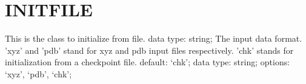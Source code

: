 \section{INITFILE}
\label{INITFILE}
\begin{ipifield}{}%
{This is the class to initialize from file.}%
{data type: string; }%
{%
{The input data format. 'xyz' and 'pdb' stand for xyz and pdb input files respectively. 'chk' stands for initialization from a checkpoint file.}%
{default: `chk'; data type: string; options: `xyz', `pdb', `chk'; }%
}
\end{ipifield}
